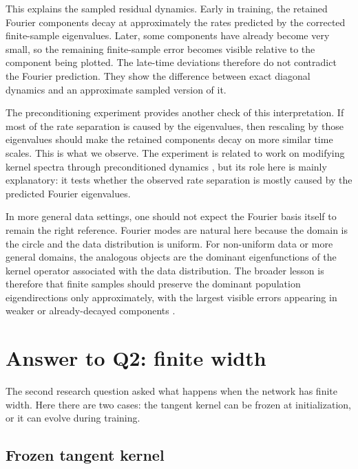 This explains the sampled residual dynamics. Early in training, the retained
Fourier components decay at approximately the rates predicted by the corrected
finite-sample eigenvalues. Later, some components have already become very
small, so the remaining finite-sample error becomes visible relative to the
component being plotted. The late-time deviations therefore do not contradict
the Fourier prediction. They show the difference between exact diagonal
dynamics and an approximate sampled version of it.

The preconditioning experiment provides another check of this interpretation.
If most of the rate separation is caused by the eigenvalues, then rescaling by
those eigenvalues should make the retained components decay on more similar time
scales. This is what we observe. The experiment is related to work on modifying
kernel spectra through preconditioned dynamics
\citep{geifman2024controlling}, but its role here is mainly explanatory: it
tests whether the observed rate separation is mostly caused by the predicted
Fourier eigenvalues.

In more general data settings, one should not expect the Fourier basis itself to
remain the right reference. Fourier modes are natural here because the domain is
the circle and the data distribution is uniform. For non-uniform data or more
general domains, the analogous objects are the dominant eigenfunctions of the
kernel operator associated with the data distribution. The broader lesson is
therefore that finite samples should preserve the dominant population
eigendirections only approximately, with the largest visible errors appearing in
weaker or already-decayed components
\citep{bietti2019inductivebiasneuraltangent,
	basri2020frequencybiasneuralnetworks,cao2020understandingspectralbiasdeep}.

\section{Answer to Q2: finite width}
\label{sec:discussion-q2}

The second research question asked what happens when the network has finite
width. Here there are two cases: the tangent kernel can be frozen at
initialization, or it can evolve during training.

\subsection{Frozen tangent kernel}
\label{subsec:discussion-q2-frozen}

